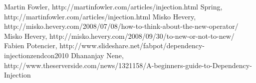 \documentclass[a4paper,conference]{IEEEtran}
\begin{document}
%
%
%
\begin{thebibliography}{1}

Martin Fowler, http://martinfowler.com/articles/injection.html
Spring, http://martinfowler.com/articles/injection.html
Misko Hevery, http://misko.hevery.com/2008/07/08/how-to-think-about-the-new-operator/
Misko Hevery, http://misko.hevery.com/2008/09/30/to-new-or-not-to-new/
Fabien Potencier, http://www.slideshare.net/fabpot/dependency-injectionzendcon2010
Dhananjay Nene, http://www.theserverside.com/news/1321158/A-beginners-guide-to-Dependency-Injection

\end{thebibliography}




\end{document}
